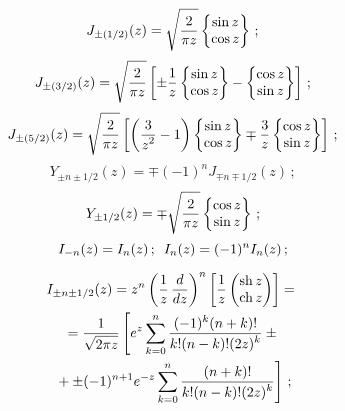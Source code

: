 \begin{multicols}{2}
{\noindent
$$
J_{\pm (1/2)} (z) = \sqrt{\fr{2}{\pi z}} \lf \begin{matrix}
    \sin z\\
    \cos z\end{matrix}\rf\,;
    $$
    $$
    J_{\pm (3/2)} (z) =\sqrt{\fr{2}{\pi z}}\lk \pm \fr{1}{z} \lf \begin{matrix}
    \sin z\\
    \cos z\end{matrix}\rf- \lf \begin{matrix}
    \cos z\\
    \sin z\cr\end{matrix}\rf \rk\,;
    $$
    $$
    J_{\pm (5/2)} (z) =\sqrt{\fr{2}{\pi z}}\lk \left( \fr{3}{z^2}-1 \right)\lf 
    \begin{matrix}
    \sin z\\
    \cos z\end{matrix}\rf\mp \fr{3}{z} \lf \begin{matrix}
    \cos z\\
    \sin z\end{matrix}\rf \rk\,;
    $$
    $$
    Y_{\pm n\pm 1/2} (z) =\mp (-1)^n J_{\mp n\mp 1/2} (z)\,;$$
    $$ 
    Y_{\pm 1/2} (z) = \mp \sqrt{\fr{2}{\pi z}} \lf \begin{matrix}
    \cos z\\
    \sin z\end{matrix}\rf \,;
    $$
    $$
    I_{-n} (z)= I_n (z)\,;\enskip I_n (z) = (-1)^n I_n (z)\,;
    $$
    
    \vspace*{-10pt}
    
    \noindent
    \begin{multline*}
    I_{\pm n \pm 1/2} (z) = z^n \left( \fr{1}{z}\,\fr{d}{dz}\right)^n \lk 
    \fr{1}{z} \begin{pmatrix}
    \mathrm{sh}\, z\\
    \mathrm{ch}\, z\end{pmatrix}\rk ={}\\
{}=\fr{1}{\sqrt{2\pi z}} \left[ e^z \sss_{k=0}^n \fr{(-1)^k (n+k)!}{k! (n-k)! (2z)^k} 
\pm {}\right.\\
\left.{}+\pm(-1)^{n+1} e^{-z} \sss_{k=0}^n \fr{(n+k)!}{k! (n-k)! (2z)^k}\right]\,;
\end{multline*}

}
\end{multicols}
